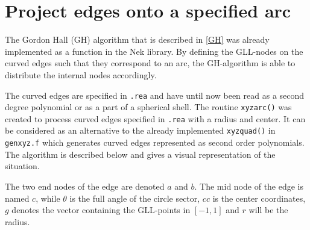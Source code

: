 


\section{Project edges onto a specified arc} \label{xyzarc}

The Gordon Hall (GH) algorithm that is described in \cref{GH} was already implemented as a function in the Nek library.
By defining the GLL-nodes on the curved edges such that they correspond to an arc, the GH-algorithm is able to distribute 
the internal nodes accordingly. 

The curved edges are specified in \verb|.rea| and have until now been read as a second degree polynomial or as a part of a 
spherical shell. The routine \verb|xyzarc()| was created to process curved edges specified in \verb|.rea| with a radius and center.
It can be considered as an alternative to the already implemented \verb|xyzquad()| in \verb|genxyz.f| which generates curved edges 
represented as second order polynomials.
The algorithm is described below and  gives a visual representation of the situation.

The two end nodes of the edge are denoted $a$ and $b$. 
The mid node of the edge is named $c$, while 
$\theta$ is the full angle of the circle sector,
$cc$ is the center coordinates, 
$g$ denotes the vector containing the GLL-points in $[-1,1]$ 
and $r$ will be the radius.

